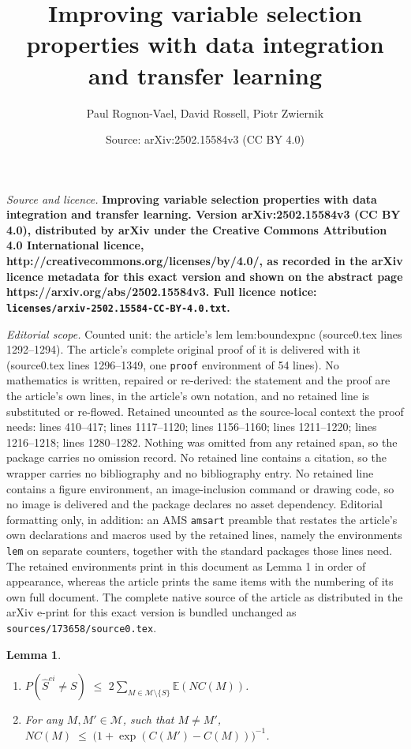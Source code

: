 \documentclass[10pt,a4paper]{amsart}
\title{\bf Improving variable selection properties with data integration and transfer learning}
\author{Paul Rognon-Vael, David Rossell, Piotr Zwiernik}
\date{Source: arXiv:2502.15584v3 (CC BY 4.0)}
\newtheorem{lem}{Lemma}
\newcommand{\E}{\mathbb{E}}
\newcommand{\M}{\mathcal{M}}
\providecommand{\tightlist}{%
  \setlength{\itemsep}{0pt}\setlength{\parskip}{0pt}}\usepackage{longtable,booktabs,array}
\begin{document}
\maketitle

\noindent\emph{Source and licence.} \bf Improving variable selection properties with data integration and transfer learning. Version arXiv:2502.15584v3 (CC BY 4.0), distributed by arXiv under the Creative Commons Attribution 4.0 International licence, http://creativecommons.org/licenses/by/4.0/, as recorded in the arXiv licence metadata for this exact version and shown on the abstract page https://arxiv.org/abs/2502.15584v3. Full licence notice: \texttt{licenses/arxiv-2502.15584-CC-BY-4.0.txt}.\par\smallskip

\noindent\textit{Editorial scope.} Counted unit: the article's lem lem:boundexpnc (source0.tex lines 1292--1294). The article's complete original proof of it is delivered with it (source0.tex lines 1296--1349, one \texttt{proof} environment of 54 lines). No mathematics is written, repaired or re-derived: the statement and the proof are the article's own lines, in the article's own notation, and no retained line is substituted or re-flowed.  Retained uncounted as the source-local context the proof needs: lines 410--417; lines 1117--1120; lines 1156--1160; lines 1211--1220; lines 1216--1218; lines 1280--1282.  Nothing was omitted from any retained span, so the package carries no omission record.  No retained line contains a citation, so the wrapper carries no bibliography and no bibliography entry.  No retained line contains a figure environment, an image-inclusion command or drawing code, so no image is delivered and the package declares no asset dependency.  Editorial formatting only, in addition: an AMS \texttt{amsart} preamble that restates the article's own declarations and macros used by the retained lines, namely the environments \texttt{lem} on separate counters, together with the standard packages those lines need.  The retained environments print in this document as Lemma 1 in order of appearance, whereas the article prints the same items with the numbering of its own full document.  The complete native source of the article as distributed in the arXiv e-print for this exact version is bundled unchanged as \texttt{sources/173658/source0.tex}.
\begin{lem}\label{lem:L0toL1convergence}
\begin{enumerate}[label= (\roman*)]\tightlist
\item
$P(\hat{S}^{ei} \neq S) \,\,\leq \,\, 2 \sum_{M \in \M\setminus \{S\}} \E\left(NC(M)\right)$.
\item  For any $M,M'\in\M$, such that $M\neq M'$, 
$NC(M)\;\leq \;\big(1+\exp(C(M')-C(M))\big)^{-1}$.
\end{enumerate}
\end{lem}
\end{document}
